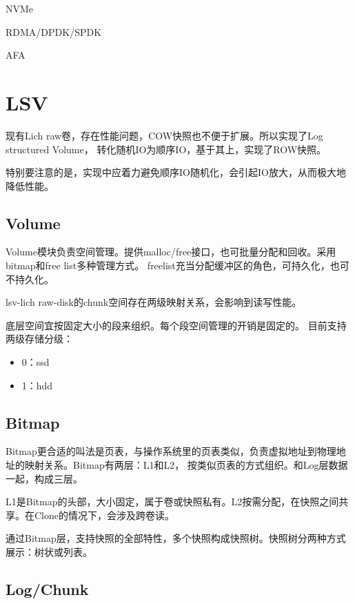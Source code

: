 \documentclass[UTF8]{ctexart}
\begin{document}
NVMe

RDMA/DPDK/SPDK

AFA


\section{LSV}

现有Lich raw卷，存在性能问题，COW快照也不便于扩展。所以实现了Log structured Volume，
转化随机IO为顺序IO，基于其上，实现了ROW快照。

特别要注意的是，实现中应着力避免顺序IO随机化，会引起IO放大，从而极大地降低性能。


\subsection{Volume}

Volume模块负责空间管理。提供malloc/free接口，也可批量分配和回收。采用bitmap和free list多种管理方式。
freelist充当分配缓冲区的角色，可持久化，也可不持久化。

lsv-lich raw-disk的chunk空间存在两级映射关系，会影响到读写性能。

底层空间宜按固定大小的段来组织。每个段空间管理的开销是固定的。
目前支持两级存储分级：
\begin{tcolorbox}
    \begin{multicols}{2}
        \begin{itemize}
            \item 0：ssd
            \item 1：hdd
        \end{itemize}
    \end{multicols}
\end{tcolorbox}

\subsection{Bitmap}

Bitmap更合适的叫法是页表，与操作系统里的页表类似，负责虚拟地址到物理地址的映射关系。Bitmap有两层：L1和L2，
按类似页表的方式组织。和Log层数据一起，构成三层。

L1是Bitmap的头部，大小固定，属于卷或快照私有。L2按需分配，在快照之间共享。在Clone的情况下，会涉及跨卷读。

通过Bitmap层，支持快照的全部特性，多个快照构成快照树。快照树分两种方式展示：树状或列表。

\subsection{Log/Chunk}
\end{document}
